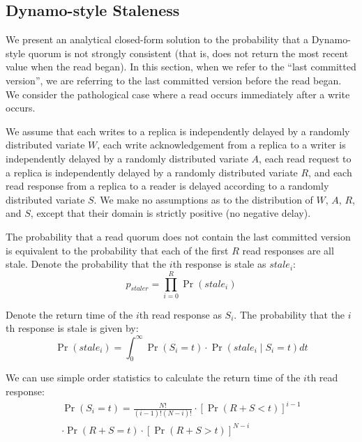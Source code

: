 \documentclass{vldb}
\begin{document}
\begin{appendix}
\section{Dynamo-style Staleness}

We present an analytical closed-form solution to the probability that
a Dynamo-style quorum is not strongly consistent (that is, does not
return the most recent value when the read began). In this section,
when we refer to the ``last committed version'', we are referring to
the last committed version before the read began. We consider the
pathological case where a read occurs immediately after a write
occurs.

We assume that each writes to a replica is independently delayed by a
randomly distributed variate $W$, each write acknowledgement from a
replica to a writer is independently delayed by a randomly distributed
variate $A$, each read request to a replica is independently delayed
by a randomly distributed variate $R$, and each read response from a
replica to a reader is delayed according to a randomly distributed
variate $S$.  We make no assumptions as to the distribution of $W$,
$A$, $R$, and $S$, except that their domain is strictly positive (no
negative delay). 

The probability that a read quorum does not contain the last committed
version is equivalent to the probability that each of the first $R$
read responses are all stale.  Denote the probability that the $i$th
response is stale as $stale_i$:
\begin{equation*}
p_{staler} = \prod_{i=0}^{R} \Pr(stale_i)
\end{equation*}

Denote the return time of the $i$th read response as $S_i$.  The probability that the $i$th response is stale is given by:
\begin{equation*}
\Pr(stale_i) = \int_{0}^{\infty} \Pr(S_i = t) \cdot \Pr(stale_i \mid S_i = t) dt
\end{equation*}

We can use simple order statistics to calculate the return time of the $i$th read response:
\begin{multline*}
\Pr(S_i = t) = \frac{N!}{(i-1)!(N-i)!}\cdot[\Pr(R+S< t)]^{i-1}\\\cdot\Pr(R+S = t)\cdot[\Pr(R+S > t)]^{N-i}
\end{multline*}


\end{appendix}
\end{document}
